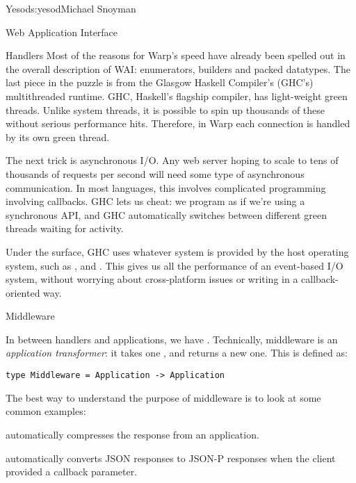 \begin{aosachapter}{Yesod}{s:yesod}{Michael Snoyman}
\begin{aosasect1}{Web Application Interface}
\begin{aosasect2}{Handlers}
Most of the reasons for Warp's speed have already been spelled out in
the overall description of WAI: enumerators, builders and packed
datatypes. The last piece in the puzzle is from the Glasgow Haskell
Compiler's (GHC's) multithreaded runtime. GHC, Haskell's flagship
compiler, has light-weight green threads. Unlike system threads, it is
possible to spin up thousands of these without serious performance
hits. Therefore, in Warp each connection is handled by its own green
thread.

The next trick is asynchronous I/O. Any web server hoping to scale to
tens of thousands of requests per second will need some type of
asynchronous communication. In most languages, this involves
complicated programming involving callbacks. GHC lets us cheat: we
program as if we're using a synchronous API, and GHC automatically
switches between different green threads waiting for activity.

Under the surface, GHC uses whatever system is provided by the host
operating system, such as ,  and
. This gives us all the performance of an event-based I/O
system, without worrying about cross-platform issues or writing in a
callback-oriented way.

\end{aosasect2}

\begin{aosasect2}{Middleware}


In between handlers and applications, we have
. Technically, middleware is an \emph{application
  transformer}: it takes one , and returns a new one. This
is defined as:

\begin{verbatim}
type Middleware = Application -> Application
\end{verbatim}

\noindent The best way to understand the purpose of middleware is to look at
some common examples:

\begin{aosaitemize}

\item {} automatically compresses the response from an
  application.

\item {} automatically converts JSON responses to JSON-P
  responses when the client provided a callback parameter.


\end{aosaitemize}
\end{aosasect2}
\end{aosasect1}
\end{aosachapter}
